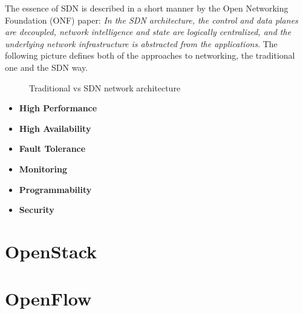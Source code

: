 \par The essence of SDN is described in a short manner by the Open Networking Foundation (ONF) paper: \textit{ In the SDN architecture, the control and data planes are decoupled,  network intelligence and state are 
logically centralized, and the underlying network infrastructure is abstracted from the applications}. The following picture defines both of the approaches to networking, the traditional one and the SDN way.

\begin{figure}[!tbph]
  \centering
  \hfill
  \caption {Traditional vs SDN network architecture}
\end{figure}

 
\begin {itemize} 
    \item \textbf{High Performance}   
    \item \textbf{High Availability} 
    \item \textbf{Fault Tolerance}   
    \item \textbf{Monitoring}   
    \item \textbf{Programmability}   
    \item \textbf{Security}   
\end {itemize}

\section {OpenStack}
\section {OpenFlow}


